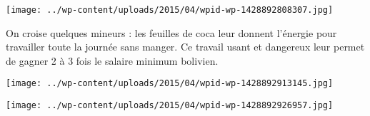  \newline
\centerline{\texttt{[image: ../wp-content/uploads/2015/04/wpid-wp-1428892808307.jpg]} } 
 \newline
 On croise quelques mineurs : les feuilles de coca leur donnent l'énergie pour travailler toute la journée sans manger. \newline
 Ce travail usant et dangereux leur permet de gagner 2 à 3 fois le salaire minimum bolivien.  \newline
 \newline
\centerline{\texttt{[image: ../wp-content/uploads/2015/04/wpid-wp-1428892913145.jpg]} } 
 \newline
 \newline
\centerline{\texttt{[image: ../wp-content/uploads/2015/04/wpid-wp-1428892926957.jpg]} } 
 \newline

\newpage
 
